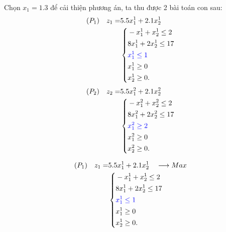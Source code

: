 \documentclass[12pt,a4paper]{report}
\begin{document}
Chọn $x_1=1.3$ để cải thiện phương án, ta thu được 2 bài toán con sau:
    \begin{equation*}
        \begin{split}
            (P_1) \quad z_1= & 5.5x^1_1 + 2.1x^1_2 \\
            & \left\{\begin{split}
            & -x^1_1 + x^1_2 \leq 2 \\
            & 8x^1_1 + 2x^1_2 \leq 17 \\
            & \color{blue} x^1_1 \leq 1 \\
            &x^1_1 \geq 0 \\
            &x^1_2 \geq 0. \\
            \end{split}\right. \\
        \end{split}
    \end{equation*}
   \begin{equation*}
        \begin{split}
            (P_2) \quad z_2= & 5.5x^2_1 + 2.1x^2_2  \\
            & \left\{\begin{split}
            & -x^2_1 + x^2_2 \leq 2 \\
            & 8x^2_1 + 2x^2_2 \leq 17 \\
            & \color{blue} x^2_1 \geq 2 \\
            &x^2_1 \geq 0 \\
            &x^2_2 \geq 0. \\
            \end{split}\right. \\
        \end{split}
    \end{equation*}



        \begin{equation*}
        \begin{split}
            (P_1) \quad z_1= & 5.5x^1_1 + 2.1x^1_2 \quad \longrightarrow Max \\
            & \left\{\begin{split}
            & -x^1_1 + x^1_2 \leq 2 \\
            & 8x^1_1 + 2x^1_2 \leq 17 \\
            & \color{blue} x^1_1 \leq 1 \\
            &x^1_1 \geq 0 \\
            &x^1_2 \geq 0. \\
            \end{split}\right. \\
        \end{split}
    \end{equation*}
\end{document}

